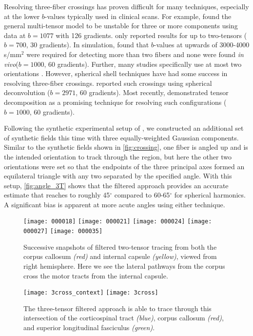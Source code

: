 \documentclass[final,hyperref]{gatech-thesis}
\newcommand{\citet}[1]{\cite{#1}} %
\renewcommand{\deg}{\ensuremath{^\circ}\xspace}
\newcommand{\bn}[1]{\ensuremath{b\!=\!#1}\xspace}
\newcommand{\invivo}{\textit{in vivo}\xspace}
\begin{document}
Resolving three-fiber crossings has proven difficult for many techniques,
especially at the lower $b$-values typically used in clinical scans.  For
example, \citet{Tuch2002} found the general multi-tensor model to be unstable
for three or more components using data at \bn{1077} with 126 gradients.
\citet{Bergmann2006} only reported results for up to two-tensors (\bn{700}, 30
gradients).  In simulation, \citet{Behrens2007} found that $b$-values at
upwards of 3000-4000 s/mm$^2$ were required for detecting more than two fibers
and none were found \invivo (\bn{1000}, 60 gradients).  Further, many studies
specifically use at most two orientations
\cite{Alexander2001,Kreher2005,Peled2006}.
%
However, spherical shell techniques have had some success in resolving
three-fiber crossings.  \citet{Tournier2004} reported such crossings using
spherical deconvolution (\bn{2971}, 60 gradients).  Most recently,
\citet{Schultz2008} demonstrated tensor decomposition as a promising technique
for resolving such configurations (\bn{1000}, 60 gradients).


Following the synthetic experimental setup of \citet{Schultz2008}, we
constructed an additional set of synthetic fields this time with three
equally-weighted Gaussian components.  Similar to the synthetic fields shown
in \autoref{fig:crossing}, one fiber is angled up and is the intended
orientation to track through the region, but here the other two orientations
were set so that the endpoints of the three principal axes formed an
equilateral triangle with any two separated by the specified angle.  With this
setup, \autoref{fig:angle_3T} shows that the filtered approach provides an
accurate estimate that reaches to roughly 45\deg compared to 60-65\deg for
spherical harmonics.  A significant bias is apparent at more acute angles
using either technique.




\begin{figure}[t]
  \centering
  \texttt{[image: 000018]}
  \texttt{[image: 000021]}
  \texttt{[image: 000024]}
  \texttt{[image: 000027]}
  \texttt{[image: 000035]}
  \caption{Successive snapshots of filtered two-tensor tracing from both the
    corpus callosum \textit{(red)} and internal capsule \textit{(yellow)},
    viewed from right hemisphere.  Here we see the lateral pathways from the
    corpus cross the motor tracts from the internal capsule.}
  \label{fig:cc_ic}
\end{figure}
\begin{figure}[t]
  \centering
  \texttt{[image: 3cross\_context]}
  \texttt{[image: 3cross]}
  \caption{The three-tensor filtered approach is able to trace through this
    intersection of the corticospinal tract \textit{(blue)}, corpus callosum
    \textit{(red)}, and superior longitudinal fasciculus \textit{(green)}.}
  \label{fig:intersection_3T}
\end{figure}
\end{document}
